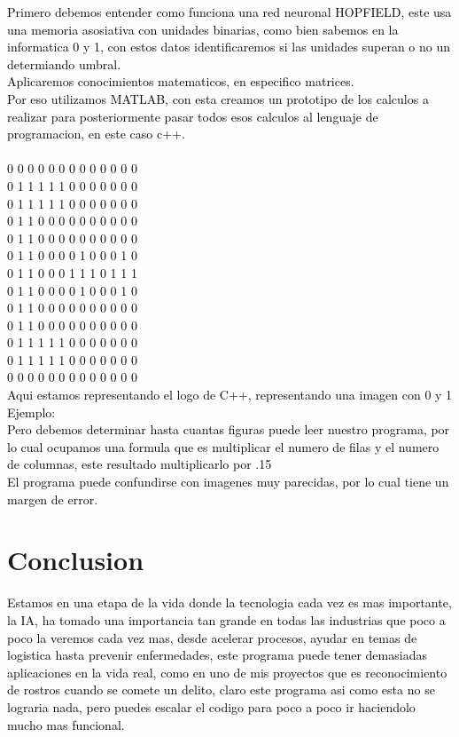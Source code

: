 \documentclass[10pt]{article} %
\begin{document}
 
 \textcolor{black}{Primero debemos entender como funciona una red neuronal HOPFIELD, este usa una memoria asosiativa con unidades binarias, como bien sabemos en la informatica 0 y 1, con estos datos identificaremos si las unidades superan o no un determiando umbral. \\Aplicaremos conocimientos matematicos, en especifico matrices. \\Por eso utilizamos MATLAB, con esta creamos un prototipo de los calculos a realizar para posteriormente pasar todos esos calculos al lenguaje de programacion, en este caso c++. \\ \\
 
0 0 0 0 0 0 0 0 0 0 0 0 0\\
0 1 1 1 1 1 0 0 0 0 0 0 0\\
0 1 1 1 1 1 0 0 0 0 0 0 0\\
0 1 1 0 0 0 0 0 0 0 0 0 0\\
0 1 1 0 0 0 0 0 0 0 0 0 0\\
0 1 1 0 0 0 0 1 0 0 0 1 0\\
0 1 1 0 0 0 1 1 1 0 1 1 1\\
0 1 1 0 0 0 0 1 0 0 0 1 0\\
0 1 1 0 0 0 0 0 0 0 0 0 0\\
0 1 1 0 0 0 0 0 0 0 0 0 0\\
0 1 1 1 1 1 0 0 0 0 0 0 0\\
0 1 1 1 1 1 0 0 0 0 0 0 0\\
0 0 0 0 0 0 0 0 0 0 0 0 0\\

 Aqui estamos representando el logo de C++, representando una imagen con 0 y 1 Ejemplo: \\ 
 
 
 Pero debemos determinar hasta cuantas figuras puede leer nuestro programa, por lo cual ocupamos una formula que es multiplicar el numero de filas y el numero de columnas, este resultado multiplicarlo por .15\\ El programa puede confundirse con imagenes muy parecidas, por lo cual tiene un margen de error.  }

 
 

 
\section{Conclusion}

\textcolor{black}{Estamos en una etapa de la vida donde la tecnologia cada vez es mas importante, la IA, ha tomado una importancia tan grande en todas las industrias que poco a poco la veremos cada vez mas, desde acelerar procesos, ayudar en temas de logistica hasta prevenir enfermedades, este programa puede tener demasiadas aplicaciones en la vida real, como en uno de mis proyectos que es reconocimiento de rostros cuando se comete un delito, claro este programa asi como esta no se lograria nada, pero puedes escalar el codigo para poco a poco ir haciendolo mucho mas funcional.}

 

 

 
\end{document}
